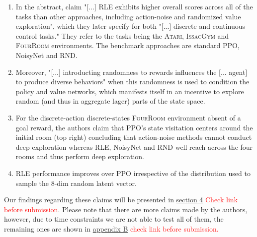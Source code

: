 \documentclass[10pt]{article} %
\begin{document}
\begin{enumerate}
    \item In the abstract, \cite{rle-paper} claim "[...] RLE exhibits higher overall scores across all of the tasks than other approaches, including action-noise and randomized value exploration", which they later specify for both "[...] discrete and continuous control tasks." They refer to the tasks being the \textsc{Atari}, \textsc{IssacGym} and \textsc{FourRoom} environments. The benchmark approaches are standard PPO, NoisyNet and RND.
    \item Moreover, "[...] introducting randomness to rewards influences the [... agent] to produce diverse behaviors" \citep{rle-paper} when this randomness is used to condition the policy and value networks, which manifests itself in an incentive to explore random (and thus in aggregate lager) parts of the state space.
    \item For the discrete-action discrete-states \textsc{FourRoom} environment absent of a goal reward, the authors claim that PPO's state visitation centers around the initial room (top right) concluding that action-noise methods cannot conduct deep exploration whereas RLE, NoisyNet and RND well reach across the four rooms and thus perform deep exploration.
    \item RLE performance improves over PPO irrespective of the distribution used to sample the 8-dim random latent vector.
\end{enumerate}

\noindent Our findings regarding these claims will be presented in \hyperlink{sec4}{section 4} \textcolor{red}{Check link before submission}. Please note that there are more claims made by the authors, however, due to time constraints we are not able to test all of them, the remaining ones are shown in \hyperlink{untested-claims}{appendix B} \textcolor{red}{check link before submission.}
\end{document}
